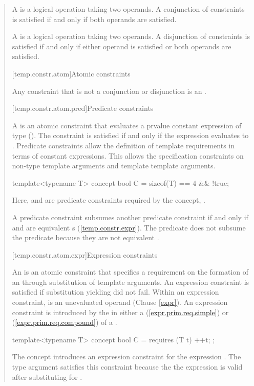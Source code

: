 \begin{quote}
\pnum
A  is a logical operation taking two 
operands. A conjunction of constraints is satisfied if and only 
if both operands are satisfied.

\pnum
A  is a logical operation taking two 
operands. A disjunction of constraints is satisfied if and only 
if either operand is satisfied or both operands are satisfied.

[temp.constr.atom]{Atomic constraints}

Any constraint that is not a conjunction or disjunction is an
.

[temp.constr.atom.pred]{Predicate constraints}

\pnum
A  is an atomic constraint
that evaluates a prvalue constant expression of type 
().
% 
The constraint is satisfied if and only if the expression 
evaluates to .
% 
\enternote
Predicate constraints allow the definition of template requirements
in terms of constant expressions. This allows the specification 
constraints on non-type template arguments and template template 
arguments.
\exitnote
% 
\enterexample
\begin{codeblock}
template<typename T> concept bool C = sizeof(T) == 4 && !true;
\end{codeblock}
Here,  and  are 
predicate constraints required by the concept, .
\exitexample

\pnum
A predicate constraint  subsumes another predicate constraint 
 if and only if  and  are equivalent 
s (\ref{temp.constr.expr}).
% 
\enterexample
The predicate  does not subsume the predicate
 because they are not equivalent
.
\exitexample



[temp.constr.atom.expr]{Expression constraints}

\pnum
An  is an atomic constraint
that specifies a requirement on the formation of an
 
through substitution of template arguments.
% 
An expression constraint is satisfied if substitution 
yielding  did not fail. 
% 
Within an expression constraint,  is an unevaluated 
operand (Clause \ref{expr}).
% 
\enternote
An expression constraint is introduced by the  in 
either a  (\ref{expr.prim.req.simple})
or  (\ref{expr.prim.req.compound})
of a .
\exitnote
% 
\enterexample
\begin{codeblock}
template<typename T> concept bool C = requires (T t) { ++t; };
\end{codeblock}
The concept  introduces an expression constraint for 
the expression .
% 
The type argument  satisfies this constraint because the
the expression  is valid after substituting 
for .
\exitexample


\end{quote}
